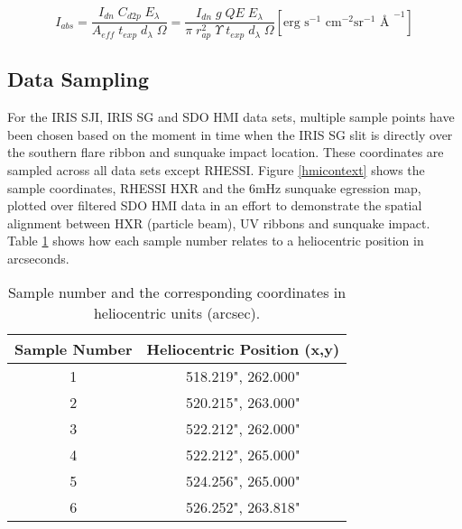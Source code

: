 \begin{equation}\label{hmiradiometriccal}
I_{abs} = \frac{I_{dn} \; C_{d2p} \; E_{\lambda}}{A_{eff} \; t_{exp} \; d_{\lambda} \; \Omega} 
        = \frac{I_{dn} \; g \; QE \; E_{\lambda}}{\pi \; r_{ap}^{2} \; \Upsilon \; t_{exp} \; d_{\lambda} \; \Omega} [\text{erg s}^{-1}\text{ cm}^{-2}\text{sr}^{-1}\text{ \AA\ }^{-1}]
\end{equation}


\subsection{Data Sampling}
For the IRIS SJI, IRIS SG and SDO HMI data sets, multiple sample points have been chosen based on the moment in time when the IRIS SG slit is directly over the southern flare ribbon and sunquake impact location. These coordinates are sampled across all data sets except RHESSI. Figure \ref{hmicontext} shows the sample coordinates, RHESSI HXR and the 6mHz sunquake egression map, plotted over filtered SDO HMI data in an effort to demonstrate the spatial alignment between HXR (particle beam), UV ribbons and sunquake impact. Table \ref{coordtab} shows how each sample number relates to a heliocentric position in arcseconds.


\begin{table}[h]

\begin{tabular}{|c|c|}
\hline
Sample Number & Heliocentric Position (x,y)\\
\hline
1 & 518.219", 262.000"\\
2 & 520.215", 263.000"\\
3 & 522.212", 262.000"\\
4 & 522.212", 265.000"\\
5 & 524.256", 265.000"\\
6 & 526.252", 263.818"\\
\hline
\end{tabular}
\caption{Sample number and the corresponding coordinates in heliocentric units (arcsec).}\label{coordtab}
\end{table}



